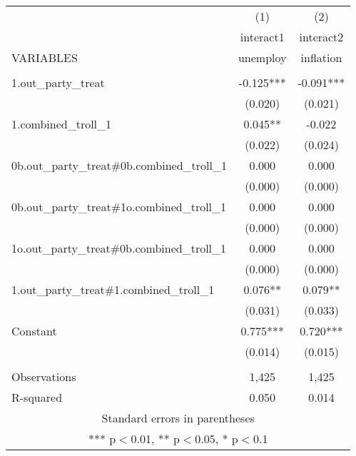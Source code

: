 \documentclass[]{article}
\begin{document}
\begin{tabular}{lcc} \hline
 & (1) & (2) \\
 & interact1 & interact2 \\
VARIABLES & unemploy & inflation \\ \hline
 &  &  \\
1.out\_party\_treat & -0.125*** & -0.091*** \\
 & (0.020) & (0.021) \\
1.combined\_troll\_1 & 0.045** & -0.022 \\
 & (0.022) & (0.024) \\
0b.out\_party\_treat\#0b.combined\_troll\_1 & 0.000 & 0.000 \\
 & (0.000) & (0.000) \\
0b.out\_party\_treat\#1o.combined\_troll\_1 & 0.000 & 0.000 \\
 & (0.000) & (0.000) \\
1o.out\_party\_treat\#0b.combined\_troll\_1 & 0.000 & 0.000 \\
 & (0.000) & (0.000) \\
1.out\_party\_treat\#1.combined\_troll\_1 & 0.076** & 0.079** \\
 & (0.031) & (0.033) \\
Constant & 0.775*** & 0.720*** \\
 & (0.014) & (0.015) \\
 &  &  \\
Observations & 1,425 & 1,425 \\
 R-squared & 0.050 & 0.014 \\ \hline
\multicolumn{3}{c}{ Standard errors in parentheses} \\
\multicolumn{3}{c}{ *** p$<$0.01, ** p$<$0.05, * p$<$0.1} \\
\end{tabular}
\end{document}

